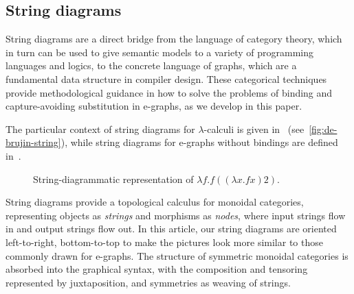 \subsection{String diagrams}

String diagrams are a direct bridge from the language of category theory, which in turn can be used to give semantic models to a variety of programming languages and logics, to the concrete language of graphs, which are a fundamental data structure in compiler design.
These categorical techniques provide methodological guidance in how to solve the problems of binding and capture-avoiding substitution in e-graphs, as we develop in this paper.

The particular context of string diagrams for $\lambda$-calculi is given in~\citet{ghica2024stringdiagramslambdacalculifunctional} (see~\autoref{fig:de-brujin-string}), while string diagrams for e-graphs without bindings are defined in~\citet{tiurin2025equivalencehypergraphsdporewriting}.
\begin{figure}
	\centering
	\caption{String-dia\-gram\-matic representation of $\lambda f . f ((\lambda x . f x) 2)$.}
	\label{fig:de-brujin-string}
\end{figure}

String diagrams provide a topological calculus for monoidal categories, representing objects as \emph{strings} and morphisms as \emph{nodes}, where input strings flow in and output strings flow out.
In this article, our string diagrams are oriented left-to-right, bottom-to-top to make the pictures look more similar to those commonly drawn for e-graphs.
The structure of symmetric monoidal categories is absorbed into the graphical syntax, with the composition and tensoring represented by juxtaposition, and symmetries as weaving of strings.

